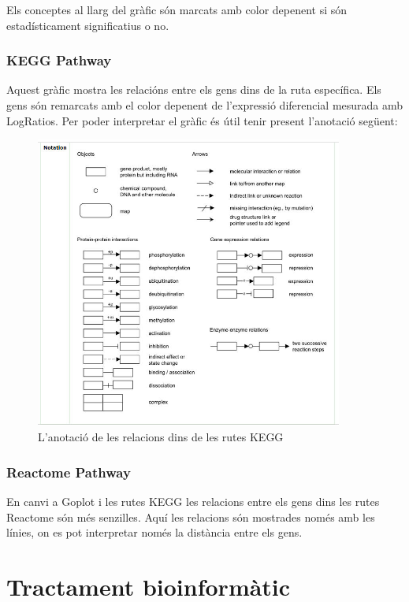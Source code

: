 \documentclass[]{article}
\begin{document}
Els conceptes al llarg del gràfic són marcats amb color depenent si són estadísticament significatius o no.

\subsubsection{KEGG Pathway}
Aquest gràfic mostra les relacións entre els gens dins de la ruta específica. Els gens són remarcats amb el color depenent de l'expressió diferencial mesurada amb LogRatios. Per poder interpretar el gràfic és útil tenir present l'anotació següent:

\begin{figure}[H]
\centering
\includegraphics[width=0.9\textwidth]{Annotation_KEGG.jpg} 
\caption{L'anotació de les relacions dins de les rutes KEGG}
\end{figure}

\subsubsection{Reactome Pathway}
En canvi a Goplot i les rutes KEGG les relacions entre els gens dins les rutes Reactome són més senzilles. Aquí les relacions són mostrades només amb les línies, on es pot interpretar només la distància entre els gens. 

\section{Tractament bioinformàtic}
\end{document}
